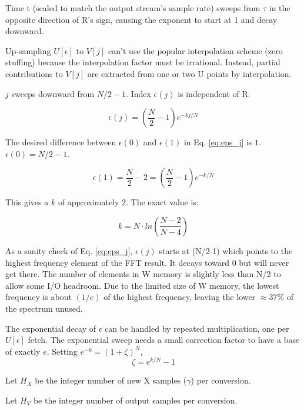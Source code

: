 Time t (scaled to match the output stream's sample rate) sweeps from $\tau$
in the opposite direction of R's sign,
causing the exponent to start at 1 and decay downward.

Up-sampling $U[\epsilon]$ to $V[j]$ can't use the popular interpolation scheme
(zero stuffing) because the interpolation factor must be irrational. Instead,
partial contributions to $V[j]$ are extracted from one or two U points by
interpolation.

$j$ sweeps downward from $N/2-1$. Index $\epsilon(j)$ is independent of R.

\begin{equation}  \label{eq:eps_j}
\epsilon(j) = \left(\frac{N}{2}-1\right) e^{-kj/N}
\end{equation}

The desired difference between $\epsilon(0)$ and $\epsilon(1)$ in
Eq. \ref{eq:eps_j} is $1$. $\epsilon(0) = N/2 - 1$.

\begin{equation}
\epsilon(1) = \frac{N}{2} - 2 = \left( \frac{N}{2} - 1 \right) e^{-k/N}
\end{equation}

This gives a $k$ of approximately $2$. The exact value is:

\begin{equation}
k = N \cdot ln \left( \frac{N-2}{N-4} \right)
\end{equation}

As a sanity check of Eq. \ref{eq:eps_j}, $\epsilon(j)$ starts at (N/2-1) which
points to the highest frequency element of the FFT result.
It decays toward 0 but will never get there.
The number of elements in W memory is slightly less than N/2 to allow some I/O
headroom. Due to the limited size of W memory,
the lowest frequency is about $(1/e)$ of the highest frequency,
leaving the lower $\approx37$\% of the spectrum unused.

The exponential decay of $\epsilon$ can be handled by repeated multiplication,
one per $U[\epsilon]$ fetch.
The exponential sweep needs a small correction factor to have a base of exactly
$e$.
Setting $e^{-k} = (1 + \zeta)^{N}$,
\begin{equation}
\zeta = e^{k/N} - 1
\end{equation}

Let $H_X$ be the integer number of new X samples ($\gamma$) per conversion.

Let $H_V$ be the integer number of output samples per conversion.

